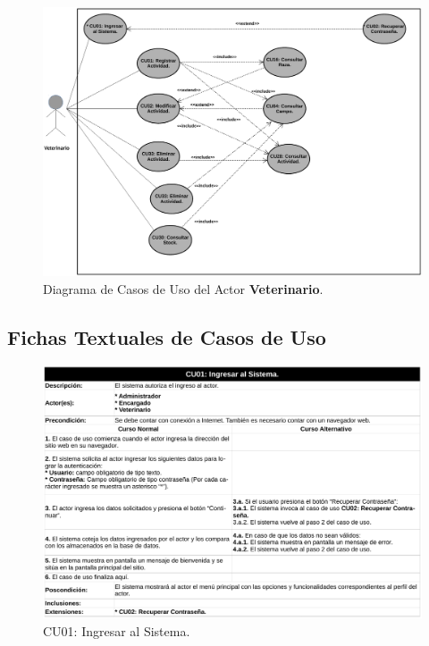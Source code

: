 \documentclass[11pt,oneside]{book}
\begin{document}
\begin{figure}[tbhp]
\centerline{\includegraphics[scale=0.5]{figs/capitulo_2_disenio/Diagrama_CU_Veterinario.pdf}}
\caption{Diagrama de Casos de Uso del Actor \textbf{Veterinario}.}
\label{Ap104}
\end{figure}

\newpage
\clearpage
\subsection{Fichas Textuales de Casos de Uso}\label{ApFCU}

\begin{figure}[tbhp]
\centerline{\includegraphics[scale=0.6]{figs/capitulo_2_disenio/fichas_cu/pg_0001.pdf}}
\caption{CU01: Ingresar al Sistema.}
\label{Ap201}
\end{figure}
\end{document}
